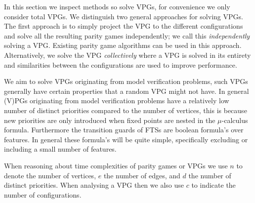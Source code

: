 In this section we inspect methods so solve VPGs, for convenience we only consider total VPGs. We distinguish two general approaches for solving VPGs. The first approach is to simply project the VPG to the different configurations and solve all the resulting parity games independently; we call this \textit{independently} solving a VPG. Existing parity game algorithms can be used in this approach. Alternatively, we solve the VPG \textit{collectively} where a VPG is solved in its entirety and similarities between the configurations are used to improve performance. 

We aim to solve VPGs originating from model verification problems, such VPGs generally have certain properties that a random VPG might not have. In general (V)PGs originating from model verification problems have a relatively low number of distinct priorities compared to the number of vertices, this is because new priorities are only introduced when fixed points are nested in the $\mu$-calculus formula. Furthermore the transition guards of FTSs are boolean formula's over features. In general these formula's will be quite simple, specifically excluding or including a small number of features.

When reasoning about time complexities of parity games or VPGs we use $n$ to denote the number of vertices, $e$ the number of edges, and $d$ the number of distinct priorities. When analysing a VPG then we also use $c$ to indicate the number of configurations.